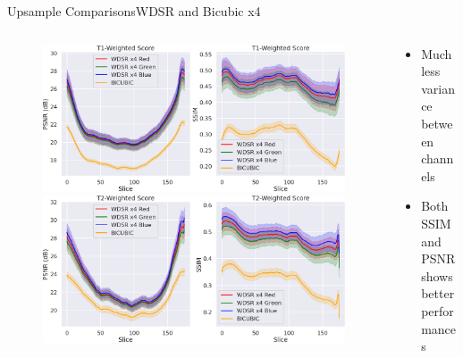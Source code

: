 \documentclass[10pt, unicode]{beamer}
\begin{document}
\begin{frame}{Upsample Comparisons}{WDSR and Bicubic x4}

  \begin{columns}
    
    \begin{column}{0.5\textwidth}
      \begin{figure}
        \vspace{-1cm}
        \includegraphics[scale=0.14]{./images/WDSR_score_slide_t1_all.png} 
        \includegraphics[scale=0.14]{./images/WDSR_score_slide_t2_all.png}
      \end{figure}
    \end{column}
    
    \begin{column}{0.5\textwidth}
      \begin{itemize}
        \item Much less variance between channels
        \item Both SSIM and PSNR shows better performances
      \end{itemize}
    \end{column}
  \end{columns}  

 
\end{frame}
\end{document}
